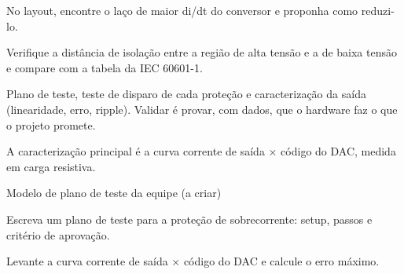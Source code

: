 \begin{pratique}
  \item No layout, encontre o laço de maior di/dt do conversor e proponha como reduzi-lo.
  \item Verifique a distância de isolação entre a região de alta tensão e a de baixa tensão e compare com a tabela da IEC 60601-1.
\end{pratique}

Plano de teste, teste de disparo de cada proteção e caracterização da saída (linearidade, erro, ripple). Validar é provar, com dados, que o hardware faz o que o projeto promete.

\begin{noproduto}
A caracterização principal é a curva corrente de saída × código do DAC, medida em carga resistiva.
\end{noproduto}

\begin{paraestudar}
  \item Modelo de plano de teste da equipe (a criar)
\end{paraestudar}

\begin{pratique}
  \item Escreva um plano de teste para a proteção de sobrecorrente: setup, passos e critério de aprovação.
  \item Levante a curva corrente de saída × código do DAC e calcule o erro máximo.
\end{pratique}
